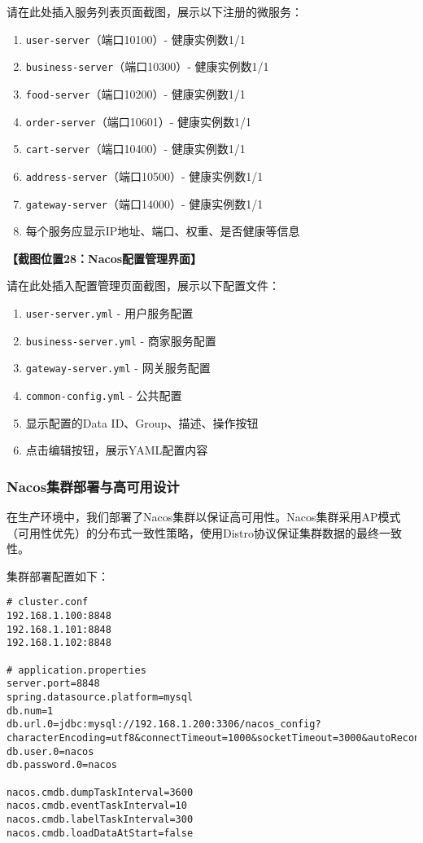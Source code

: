 \documentclass[a4paper,12pt]{article}
\begin{document}
请在此处插入服务列表页面截图，展示以下注册的微服务：
\begin{enumerate}
\item \texttt{user-server}（端口10100）- 健康实例数1/1
\item \texttt{business-server}（端口10300）- 健康实例数1/1  
\item \texttt{food-server}（端口10200）- 健康实例数1/1
\item \texttt{order-server}（端口10601）- 健康实例数1/1
\item \texttt{cart-server}（端口10400）- 健康实例数1/1
\item \texttt{address-server}（端口10500）- 健康实例数1/1
\item \texttt{gateway-server}（端口14000）- 健康实例数1/1
\item 每个服务应显示IP地址、端口、权重、是否健康等信息
\end{enumerate}

\textbf{【截图位置28：Nacos配置管理界面】}

请在此处插入配置管理页面截图，展示以下配置文件：
\begin{enumerate}
\item \texttt{user-server.yml} - 用户服务配置
\item \texttt{business-server.yml} - 商家服务配置
\item \texttt{gateway-server.yml} - 网关服务配置
\item \texttt{common-config.yml} - 公共配置
\item 显示配置的Data ID、Group、描述、操作按钮
\item 点击编辑按钮，展示YAML配置内容
\end{enumerate}

\subsubsection{Nacos集群部署与高可用设计}

在生产环境中，我们部署了Nacos集群以保证高可用性。Nacos集群采用AP模式（可用性优先）的分布式一致性策略，使用Distro协议保证集群数据的最终一致性。

集群部署配置如下：

\begin{lstlisting}[caption=Nacos集群配置]
# cluster.conf
192.168.1.100:8848
192.168.1.101:8848  
192.168.1.102:8848

# application.properties
server.port=8848
spring.datasource.platform=mysql
db.num=1
db.url.0=jdbc:mysql://192.168.1.200:3306/nacos_config?characterEncoding=utf8&connectTimeout=1000&socketTimeout=3000&autoReconnect=true&useUnicode=true&useSSL=false&serverTimezone=UTC
db.user.0=nacos
db.password.0=nacos

nacos.cmdb.dumpTaskInterval=3600
nacos.cmdb.eventTaskInterval=10
nacos.cmdb.labelTaskInterval=300
nacos.cmdb.loadDataAtStart=false
\end{lstlisting}
\end{document}
